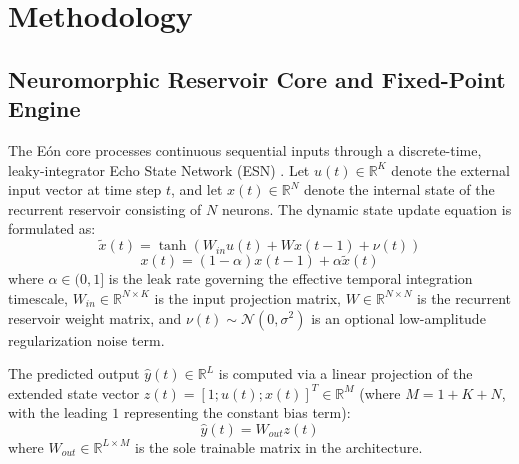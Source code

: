 \section{Methodology}

\subsection{Neuromorphic Reservoir Core and Fixed-Point Engine}
The Eón core processes continuous sequential inputs through a discrete-time, leaky-integrator Echo State Network (ESN) \cite{jaeger2001echo}. Let $u(t) \in \mathbb{R}^K$ denote the external input vector at time step $t$, and let $x(t) \in \mathbb{R}^N$ denote the internal state of the recurrent reservoir consisting of $N$ neurons. The dynamic state update equation is formulated as:
\begin{equation}
    \tilde{x}(t) = \tanh\left( W_{in} u(t) + W x(t-1) + \nu(t) \right)
    \label{eq:state_pre}
\end{equation}
\begin{equation}
    x(t) = (1 - \alpha) x(t-1) + \alpha \tilde{x}(t)
    \label{eq:state_leak}
\end{equation}
where $\alpha \in (0, 1]$ is the leak rate governing the effective temporal integration timescale, $W_{in} \in \mathbb{R}^{N \times K}$ is the input projection matrix, $W \in \mathbb{R}^{N \times N}$ is the recurrent reservoir weight matrix, and $\nu(t) \sim \mathcal{N}(0, \sigma^2)$ is an optional low-amplitude regularization noise term.

The predicted output $\hat{y}(t) \in \mathbb{R}^L$ is computed via a linear projection of the extended state vector $z(t) = [1; u(t); x(t)]^T \in \mathbb{R}^{M}$ (where $M = 1 + K + N$, with the leading $1$ representing the constant bias term):
\begin{equation}
    \hat{y}(t) = W_{out} z(t)
    \label{eq:readout}
\end{equation}
where $W_{out} \in \mathbb{R}^{L \times M}$ is the sole trainable matrix in the architecture.

